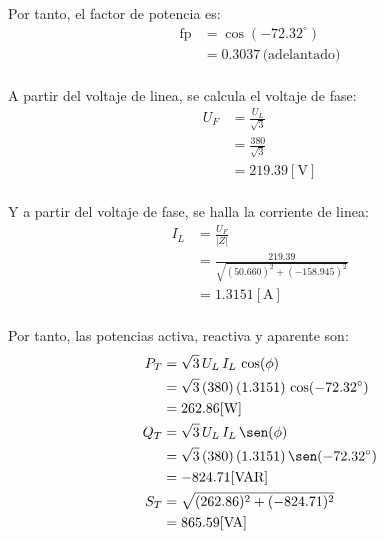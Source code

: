 \documentclass[letter,11pt]{article}
\begin{document}
Por tanto, el factor de potencia es:
\begin{equation*}
    \begin{split}
        \text{fp} &= \cos(-72.32^{\circ})\\
                  &= 0.3037\,\text{(adelantado)}\\
    \end{split}
\end{equation*}

A partir del voltaje de linea, se calcula el voltaje de fase:
\begin{equation*}
    \begin{split}
        U_F &= \frac{U_L}{\sqrt{3}}\\
            &= \frac{380}{\sqrt{3}}\\
            &= 219.39[\text{V}]\\
    \end{split}
\end{equation*}

Y a partir del voltaje de fase, se halla la corriente de linea:
\begin{equation*}
    \begin{split}
        I_L &= \frac{U_F}{|Z|}\\
            &= \frac{219.39}{\sqrt{(50.660)^2+(-158.945)^2}}\\
            &= 1.3151[\text{A}]\\
    \end{split}
\end{equation*}

Por tanto, las potencias activa, reactiva y aparente son:
\begin{equation*}
    \begin{split}
        P_T &= \sqrt{3}\,U_L\,I_L\,\cos(\phi)\\
            &= \sqrt{3}\,(380)\,(1.3151)\,\cos(-72.32^{\circ})\\
            &= 262.86[\text{W}]\\
        Q_T &= \sqrt{3}\,U_L\,I_L\,\sen(\phi)\\
            &= \sqrt{3}\,(380)\,(1.3151)\,\sen(-72.32^{\circ})\\
            &= -824.71[\text{VAR}]\\
        S_T &= \sqrt{(262.86)^2+(-824.71)^2}\\
            &= 865.59[\text{VA}]\\
    \end{split}
\end{equation*}
\end{document}
